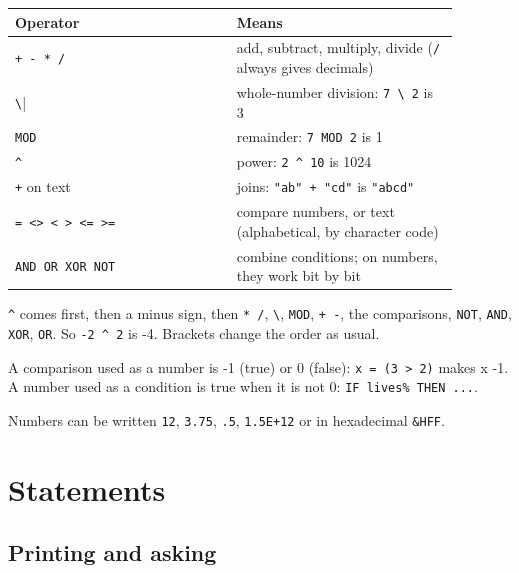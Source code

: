 \begin{center}
\small
\begin{tabular}{@{}>{\raggedright\arraybackslash}p{0.44\linewidth} >{\raggedright\arraybackslash}p{0.44\linewidth}@{}}
\toprule
\textbf{Operator} & \textbf{Means} \\
\midrule
\texttt{+ -{} * /} & add, subtract, multiply, divide (\verb|/| always gives decimals) \\
\verb|\| & whole-number division: \texttt{7 \textbackslash{} 2} is 3 \\
\verb|MOD| & remainder: \texttt{7 MOD 2} is 1 \\
\verb|^| & power: \texttt{2 \textasciicircum{} 10} is 1024 \\
\verb|+| on text & joins: \texttt{"ab" + "cd"} is \verb|"abcd"| \\
\texttt{= <> < > <= >=} & compare numbers, or text (alphabetical, by character code) \\
\texttt{AND OR XOR NOT} & combine conditions; on numbers, they work bit by bit \\
\bottomrule
\end{tabular}
\end{center}

\verb|^| comes first, then a minus sign, then \texttt{* /}, \verb|\|, \verb|MOD|, \texttt{+ -{}}, the
comparisons, \verb|NOT|, \verb|AND|, \verb|XOR|, \verb|OR|. So \texttt{-{}2 \textasciicircum{} 2} is -4. Brackets
change the order as usual.

A comparison used as a number is -1 (true) or 0 (false):
\texttt{x = (3 > 2)} makes x -1. A number used as a condition is true when it
is not 0: \texttt{IF lives\% THEN ...}.

Numbers can be written \verb|12|, \verb|3.75|, \verb|.5|, \verb|1.5E+12| or in hexadecimal
\verb|&HFF|.

\section{Statements}

\subsection{Printing and asking}

